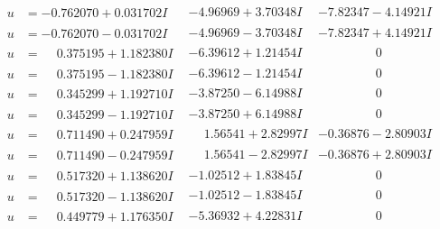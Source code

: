 \documentclass[1p]{elsarticle_modified}
\theoremstyle{definition}
\begin{document}
$$\begin{array}{c|c|c}
\begin{aligned}
u &= -0.762070 + 0.031702 I\end{aligned}
 & -4.96969 + 3.70348 I & -7.82347 - 4.14921 I \\ \hline\begin{aligned}
u &= -0.762070 - 0.031702 I\end{aligned}
 & -4.96969 - 3.70348 I & -7.82347 + 4.14921 I \\ \hline\begin{aligned}
u &= \phantom{-}0.375195 + 1.182380 I\end{aligned}
 & -6.39612 + 1.21454 I & \phantom{-0.000000 } 0 \\ \hline\begin{aligned}
u &= \phantom{-}0.375195 - 1.182380 I\end{aligned}
 & -6.39612 - 1.21454 I & \phantom{-0.000000 } 0 \\ \hline\begin{aligned}
u &= \phantom{-}0.345299 + 1.192710 I\end{aligned}
 & -3.87250 - 6.14988 I & \phantom{-0.000000 } 0 \\ \hline\begin{aligned}
u &= \phantom{-}0.345299 - 1.192710 I\end{aligned}
 & -3.87250 + 6.14988 I & \phantom{-0.000000 } 0 \\ \hline\begin{aligned}
u &= \phantom{-}0.711490 + 0.247959 I\end{aligned}
 & \phantom{-}1.56541 + 2.82997 I & -0.36876 - 2.80903 I \\ \hline\begin{aligned}
u &= \phantom{-}0.711490 - 0.247959 I\end{aligned}
 & \phantom{-}1.56541 - 2.82997 I & -0.36876 + 2.80903 I \\ \hline\begin{aligned}
u &= \phantom{-}0.517320 + 1.138620 I\end{aligned}
 & -1.02512 + 1.83845 I & \phantom{-0.000000 } 0 \\ \hline\begin{aligned}
u &= \phantom{-}0.517320 - 1.138620 I\end{aligned}
 & -1.02512 - 1.83845 I & \phantom{-0.000000 } 0 \\ \hline\begin{aligned}
u &= \phantom{-}0.449779 + 1.176350 I\end{aligned}
 & -5.36932 + 4.22831 I & \phantom{-0.000000 } 0 \\ \hline\begin{aligned}

\end{aligned}
\end{array}$$
\end{document}
